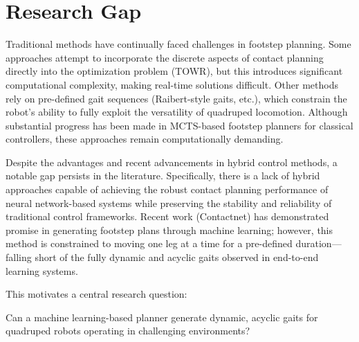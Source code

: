 \section{Research Gap}

Traditional methods have continually faced challenges in footstep
planning. Some approaches attempt to incorporate the discrete aspects
of contact planning directly into the optimization problem (TOWR),
but this introduces significant computational complexity, making
real-time solutions difficult. Other methods rely on pre-defined gait
sequences (Raibert-style gaits, etc.), which constrain the robot's
ability to fully exploit the versatility of quadruped locomotion.
Although substantial progress has been made in MCTS-based footstep
planners for classical controllers, these approaches remain
computationally demanding.

Despite the advantages and recent advancements in hybrid control
methods, a notable gap persists in the literature. Specifically,
there is a lack of hybrid approaches capable of achieving the robust
contact planning performance of neural network-based systems while
preserving the stability and reliability of traditional control
frameworks. Recent work (Contactnet) has demonstrated promise in
generating footstep plans through machine learning; however, this
method is constrained to moving one leg at a time for a pre-defined
duration—falling short of the fully dynamic and acyclic gaits
observed in end-to-end learning systems.

This motivates a central research question:

\begin{emphasis}
  Can a machine learning-based planner generate dynamic, acyclic
  gaits for quadruped robots operating in challenging environments?
\end{emphasis}
